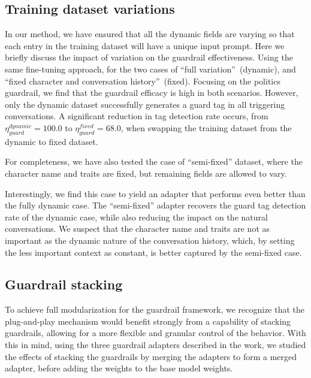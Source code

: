 \documentclass[letterpaper]{article}
\newcommand{\tagDetectionPoliticsFixed}{68.0}
\newcommand{\tagDetectionPolitics}{100.0}
\begin{document}
\subsection{Training dataset variations}
In our method, we have ensured that all the dynamic fields are varying so that each entry in the training dataset will have a unique input prompt. 
Here we briefly discuss the impact of variation on the guardrail effectiveness. 
Using the same fine-tuning approach, for the two cases of ``full variation''~(dynamic),  and ``fixed character and conversation history''~(fixed). 
Focusing on the politics guardrail, we find that the guardrail efficacy is high in both scenarios. However, only the dynamic dataset successfully generates a guard tag in all triggering conversations.
A significant reduction in tag detection rate occurs, from $\eta_{guard}^{dynamic} = \tagDetectionPolitics$ to $\eta_{guard}^{fixed} = \tagDetectionPoliticsFixed$, when swapping the training dataset from the dynamic to fixed dataset.

For completeness, we have also tested the case of ``semi-fixed'' dataset, where the character name and traits are fixed, but remaining fields are allowed to vary. 

Interestingly, we find this case to yield an adapter that performs even better than the fully dynamic case. The ``semi-fixed'' adapter recovers the guard tag detection rate of the dynamic case, while also reducing the impact on the natural conversations.
We suspect that the character name and traits are not as important as the dynamic nature of the conversation history, which, by setting the less important context as constant, is better captured by the semi-fixed case.

\subsection{Guardrail stacking}
To achieve full modularization for the guardrail framework, we recognize that the plug-and-play mechanism would benefit strongly from a capability of stacking guardrails, allowing for a more flexible and granular control of the behavior. 
With this in mind, using the three guardrail adapters described in the work, we studied the effects of stacking the guardrails by merging the adapters to form a merged adapter, before adding the weights to the base model weights. 
\end{document}
